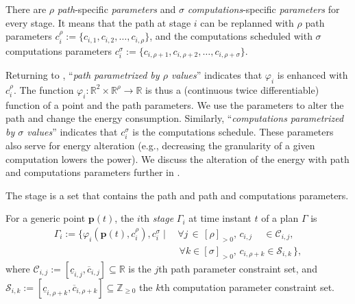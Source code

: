There are $\rho$ \emph{path}-specific \emph{parameters} and $\sigma$ \emph{computations}-specific \emph{parameters} for every stage. It means that the path at stage $i$ can be replanned with $\rho$ path parameters
$c_i^\rho:=\{c_{i,1},c_{i,2},\dots,c_{i,\rho}\}$, and the computations 
scheduled with $\sigma$ computations parameters 
$c_i^\sigma:=\{c_{i,\rho+1},c_{i,\rho+2},\dots,c_{i,\rho+\sigma}\}$.

Returning to , ``{\itshape path parametrized by $\rho$ values}'' indicates that $\varphi_i$ is enhanced with $c_i^\rho$. The function $\varphi_i:\mathbb{R}^2\times\mathbb{R}^\rho\rightarrow\mathbb{R}$ is thus a (continuous twice differentiable) function of a point and the path parameters. We use the parameters to alter the path and change the energy consumption. Similarly, ``{\itshape computations parametrized by $\sigma$ values}'' indicates that $c_i^\sigma$ is the computations schedule. These parameters also serve for energy alteration (e.g., decreasing the granularity of a given computation lowers the power). We discuss the alteration of the energy with path and computations parameters further in .

The stage is a set that contains the path and path and computations parameters.

\begin{defn}[Stage]
  \label{def:stage}
  For a generic point $\mathbf{p}(t)$, the $i$th \emph{stage} $\Gamma_i$ at time instant $t$ of a plan $\Gamma$ is
  \begin{equation*}\begin{split}
    \Gamma_i:=\{\varphi_i(\mathbf{p}(t),c_i^\rho),c_i^\sigma\mid
    \,&\forall j\,\in\,[\rho]_{>0},\,c_{i,j}\,\,\,\,\,\,\,\in\mathcal{C}_{i,j},\,\\
      &\,\forall k\in[\sigma]_{>0},\,c_{i,\rho+k}\in\mathcal{S}_{i,k}\,\},
  \end{split}\end{equation*}
  where $\mathcal{C}_{i,j}:=[\underline{c}_{i,j},\overline{c}_{i,j}]\subseteq\mathbb{R}$ is the $j$th path parameter constraint set, and $\mathcal{S}_{i,k}:=[\underline{c}_{i,\rho+k},\overline{c}_{i,\rho+k}]\subseteq\mathbb{Z}_{\geq 0}$ the $k$th computation parameter constraint set.
\end{defn}

